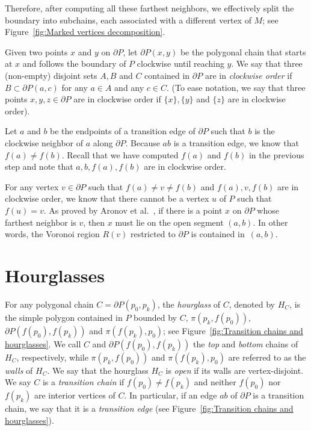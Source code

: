 \documentclass[a4paper,UKenglish]{lipics}
\newcommand{\ff}[1]{\ensuremath{f(#1)}}
\newcommand{\p}[2]{\ensuremath{\pi(#1, #2)}}
\begin{document}
Therefore, after computing all these farthest neighbors, we effectively split the boundary into subchains, each associated with a different vertex of $M$; see Figure~\ref{fig:Marked vertices decomposition}.


Given two points $x$ and $y$ on $\partial P$, let $\partial P(x,y)$ be the polygonal chain that starts at $x$ and follows the boundary of $P$ clockwise until reaching $y$.
We say that three (non-empty) disjoint sets $A,B$ and $C$ contained in $\partial P$ are in \emph{clockwise order} if $B\subset \partial P(a,c)$ for any $a\in A$ and any $c\in C$. (To ease notation, we say that three points $x,y,z\in \partial P$ are in clockwise order if $\{x\}, \{y\}$ and $\{z\}$ are in clockwise order).

Let $a$ and $b$ be the endpoints of a transition edge of $\partial P$ such that 
$b$ is the clockwise neighbor of $a$ along $\partial P$. Because $ab$ is a transition edge, we know that $\ff{a}\neq \ff{b}$.
Recall that we have computed $\ff{a}$ and $\ff{b}$ in the previous step and note that $a,b, \ff{a}, \ff{b}$ are in clockwise order. 
 
For any vertex $v\in \partial P$ such that $\ff{a}\neq v\neq \ff{b}$ and  $\ff{a}, v, \ff{b}$ are in clockwise order, we know that there cannot be a vertex $u$ of $P$ such that $\ff{u} = v$.
As proved by Aronov et al.~\cite[Corollary 2.7.4]{aronov1993furthest}, 
if there is a point $x$ on $\partial P$ whose farthest neighbor is $v$, then $x$ must lie on the open segment $(a,b)$. 
In other words, the Voronoi region $R(v)$ restricted to $\partial P$ is contained in~$(a,b)$.


\section{Hourglasses}\label{Section: Building hourglasses}

For any polygonal chain $C= \partial P(p_0, p_k)$, the \emph{hourglass} of $C$, denoted by $H_C$, is the simple polygon contained in $P$ bounded by $C$, $\p{p_k}{\ff{p_0}}$, $\partial P(\ff{p_0}, \ff{p_k})$ and $\p{\ff{p_k}}{ p_0}$; see Figure~\ref{fig:Transition chains and hourglasses}. 
We call $C$ and $\partial P(\ff{p_0}, \ff{p_k})$ the \emph{top} and \emph{bottom} chains of $H_C$, respectively, while $\p{p_k}{ \ff{p_0}}$ and $\p{\ff{p_k}}{p_0}$ are referred to as the \emph{walls} of $H_C$.
We say that the hourglass $H_C$ is \emph{open} if its walls are vertex-disjoint. 
We say $C$ is a \emph{transition chain} if $\ff{p_0} \neq \ff{p_k}$ and neither $\ff{p_0}$ nor $\ff{p_k}$ are interior vertices of $C$. In particular, if an edge $ab$ of $\partial P$ is a transition chain, we say that it is a \emph{transition edge} (see Figure~\ref{fig:Transition chains and hourglasses}).
\end{document}
